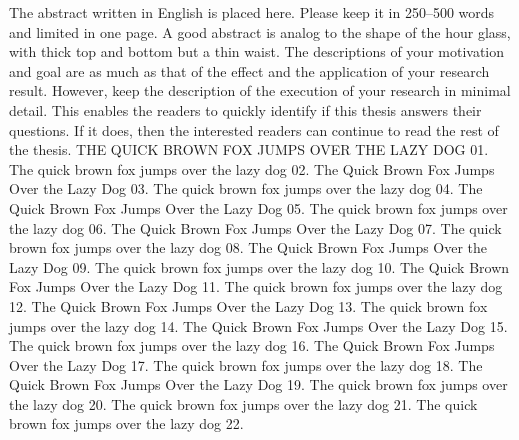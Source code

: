 The abstract written in English is placed here.  Please keep it in 250--500 words and limited in one page. A good abstract is analog to the shape of the hour glass, with thick top and bottom but a thin waist. The descriptions of your motivation and goal are as much as that of the effect and the application of your research result.  However, keep the description of the execution of your research in  minimal detail.  This enables the readers to quickly identify if this thesis answers their questions.  If it does, then the interested readers can continue to read the rest of the thesis. THE QUICK BROWN FOX JUMPS OVER THE LAZY DOG 01.  The quick brown fox jumps over the lazy dog 02.  The Quick Brown Fox Jumps Over the Lazy Dog 03.  The quick brown fox jumps over the lazy dog 04.  The Quick Brown Fox Jumps Over the Lazy Dog 05.  The quick brown fox jumps over the lazy dog 06.  The Quick Brown Fox Jumps Over the Lazy Dog 07.  The quick brown fox jumps over the lazy dog 08.  The Quick Brown Fox Jumps Over the Lazy Dog 09.  The quick brown fox jumps over the lazy dog 10.  The Quick Brown Fox Jumps Over the Lazy Dog 11.  The quick brown fox jumps over the lazy dog 12.  The Quick Brown Fox Jumps Over the Lazy Dog 13.  The quick brown fox jumps over the lazy dog 14.  The Quick Brown Fox Jumps Over the Lazy Dog 15.  The quick brown fox jumps over the lazy dog 16.  The Quick Brown Fox Jumps Over the Lazy Dog 17.  The quick brown fox jumps over the lazy dog 18.  The Quick Brown Fox Jumps Over the Lazy Dog 19.  The quick brown fox jumps over the lazy dog 20.  The quick brown fox jumps over the lazy dog 21.  The quick brown fox jumps over the lazy dog 22.
